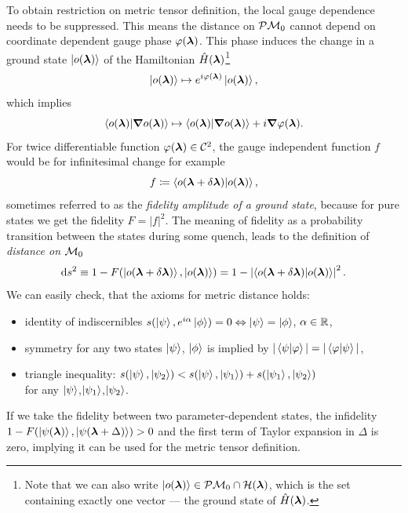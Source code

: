 To obtain restriction on metric tensor definition, the local gauge dependence needs to be suppressed. This means the distance on $\mathcal{P}\mathcal{M}_0$ cannot depend on coordinate dependent gauge phase $\varphi({\bm\lambda})$. This phase induces the change in a ground state $\ket{o({\bm\lambda})}$ of the Hamiltonian $\hat{H}({\bm\lambda})$\footnote{Note that we can also write $\ket{o({\bm\lambda})}\in \mathcal{P}\mathcal{M}_0\cap \mathcal{H}({\bm\lambda})$, which is the set containing exactly one vector — the ground state of $\hat{H}({\bm\lambda})$.}
\begin{equation}
    \ket{o({\bm\lambda})}\mapsto e^{i\varphi({\bm\lambda})} \ket{o({\bm\lambda})},
\end{equation}
which implies
\begin{equation}
        \braket{o({\bm\lambda})|\bm \nabla o({\bm\lambda})}\mapsto \braket{o({\bm\lambda})|\bm \nabla o({\bm\lambda})} + i\bm \nabla \varphi({\bm\lambda}).
\end{equation} 
For twice differentiable function $\varphi({\bm\lambda})\in \mathcal C^2$, the gauge independent function $f$ would be for infinitesimal change for example
\begin{equation}
    f\coloneqq \braket{o(\bm{{\bm\lambda}}+\delta\bm{{\bm\lambda}})|o(\bm{{\bm\lambda}})},
    \label{eq:fidelityDefinition}
\end{equation}
sometimes referred to as the \emph{fidelity amplitude of a ground state}, because for pure states we get the fidelity $F=|f|^2$. The meaning of fidelity as a probability transition between the states during some quench, leads to the definition of \emph{distance on $\mathcal{M}_0$}
\begin{equation}
    \mathrm{d} s^2 \equiv 1-F(\ket{o(\bm{{\bm\lambda}}+\delta\bm{{\bm\lambda}})},\ket{o({\bm\lambda})})= 1-\left|\braket{o(\bm{{\bm\lambda}}+\delta\bm{{\bm\lambda}})|o(\bm{{\bm\lambda}})}\right|^2.
    \label{eq:distanceOnM0}
\end{equation}
We can easily check, that the axioms for metric distance holds:
\begin{itemize}
    \item identity of indiscernibles $s(\ket{\psi},e^{i\alpha}\ket{\phi}) = 0 \Leftrightarrow \ket{\psi}=\ket{\phi}$, $\alpha\in\mathbb{R}$,
    \item symmetry for any two states $\ket{\psi}$, $\ket{\phi}$ is implied by $|\braket{\psi|\varphi}|=|\braket{\varphi|\psi}|$,
    \item triangle inequality: $s(\ket{\psi},\ket{\psi_2}) <s(\ket{\psi},\ket{\psi_1}) + s(\ket{\psi_1},\ket{\psi_2})$\\
    for any $\ket{\psi}$,$\ket{\psi_1}$,$\ket{\psi_2}$.
\end{itemize}
If we take the fidelity between two parameter-dependent states, the infidelity $1-F(\ket{\psi({\bm\lambda})},\ket{\psi({\bm\lambda}+\Delta)})>0$ and the first term of Taylor expansion in $\Delta$ is zero, implying it can be used for the metric tensor definition.

